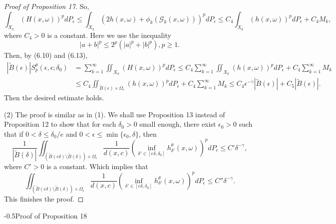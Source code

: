 \documentclass[11pt,oneside]{article}
\makeatletter
\theoremstyle{plain}
\numberwithin{equation}{section}
\numberwithin{figure}{section}
\numberwithin{table}{section}
\renewcommand{\subsection}{\@startsection{subsection}{1}{0mm}
{-\baselineskip}{0.5\baselineskip}{\large\bf\leftline}}
\makeatother
\begin{document}
\begin{proof}[Proof of Proposition 17]
So,
\[
\int_{X_k} (H(x, \omega))^p d P_{\epsilon} \leq \int_{X_k} (2h(x, \omega) + \phi_k(\mathscr G_k(x, \omega)))^p d P_{\epsilon} \leq C_4 \int_{X_k} (h(x, \omega) )^p d P_{\epsilon} + C_4 M_k,
\]
where $C_4 > 0$ is a constant. Here we use the inequality 
\[
|a+b|^p \leq 2^p (|a|^p + |b|^p), p \geq 1.
\]
Then, by (6.10) and (6.13), 
\begin{align*}
| \tilde B(\epsilon) | S_p^{\theta} (\epsilon, \epsilon; \delta_0) & =  \sum_{k=1}^{\infty} \iint_{X_k} (H(x, \omega))^p d P_{\epsilon}  \leq C_4 \sum_{k=1}^{\infty} \iint_{X_k} (h(x, \omega))^p d P_{\epsilon} + C_4 \sum_{k=1}^{\infty} M_k\\
& \leq C_4 \iint_{\tilde B(\epsilon) \times \Omega_{\epsilon}} (h(x, \omega))^p d P_{\epsilon} + C_4 \sum_{k=1}^{\infty} M_k \leq C_4 \epsilon^{-\gamma} |\tilde B(\epsilon)| + C_5  |\tilde B(\epsilon)|.
\end{align*}
Then the desired estimate holds.


(2) The proof is similar as in (1). We shall use Proposition 13 instead of Proposition 12 to show that for  each $\delta_0> 0$ small enough, there exist $\epsilon_0 >0$ such that if $0 < \delta \leq \delta_0/e $ and $0 < \epsilon \leq \min\{\epsilon_0, \delta \}$, then 
\[
\frac{1}{|\tilde B(\delta)|} \iint_{(\tilde B(e \delta) \setminus \tilde B(\delta))\times \Omega_{\epsilon}} \frac{1}{d(x, c)} \left( \inf_{\delta' \in [e\delta, \delta_0]} h^{\theta}_{\delta'} (x, \omega) \right)^p d P_{\epsilon} \leq C' \delta^{-\gamma},
\]
where $C' > 0$ is a constant. Which implies that
\[
\iint_{(\tilde B(e \delta) \setminus \tilde B(\delta))\times \Omega_{\epsilon}} \frac{1}{d(x, c)} \left( \inf_{\delta' \in [e\delta, \delta_0]} h^{\theta}_{\delta'} (x, \omega) \right)^p d P_{\epsilon} \leq C'' \delta^{-\gamma}.
\]
This finishes the proof.

\end{proof}


\subsection{Proof of Proposition 18}
\end{document}
